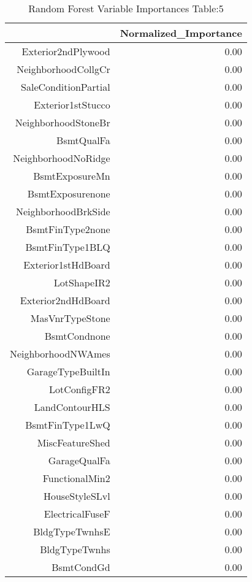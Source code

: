 \begin{table}[ht]
\centering
\begin{tabular}{rr}
  \hline
 & Normalized\_Importance \\ 
  \hline
Exterior2ndPlywood & 0.00 \\ 
  NeighborhoodCollgCr & 0.00 \\ 
  SaleConditionPartial & 0.00 \\ 
  Exterior1stStucco & 0.00 \\ 
  NeighborhoodStoneBr & 0.00 \\ 
  BsmtQualFa & 0.00 \\ 
  NeighborhoodNoRidge & 0.00 \\ 
  BsmtExposureMn & 0.00 \\ 
  BsmtExposurenone & 0.00 \\ 
  NeighborhoodBrkSide & 0.00 \\ 
  BsmtFinType2none & 0.00 \\ 
  BsmtFinType1BLQ & 0.00 \\ 
  Exterior1stHdBoard & 0.00 \\ 
  LotShapeIR2 & 0.00 \\ 
  Exterior2ndHdBoard & 0.00 \\ 
  MasVnrTypeStone & 0.00 \\ 
  BsmtCondnone & 0.00 \\ 
  NeighborhoodNWAmes & 0.00 \\ 
  GarageTypeBuiltIn & 0.00 \\ 
  LotConfigFR2 & 0.00 \\ 
  LandContourHLS & 0.00 \\ 
  BsmtFinType1LwQ & 0.00 \\ 
  MiscFeatureShed & 0.00 \\ 
  GarageQualFa & 0.00 \\ 
  FunctionalMin2 & 0.00 \\ 
  HouseStyleSLvl & 0.00 \\ 
  ElectricalFuseF & 0.00 \\ 
  BldgTypeTwnhsE & 0.00 \\ 
  BldgTypeTwnhs & 0.00 \\ 
  BsmtCondGd & 0.00 \\ 
   \hline
\end{tabular}
\caption{Random Forest Variable Importances Table:5} 
\label{tab:importance5}
\end{table}

